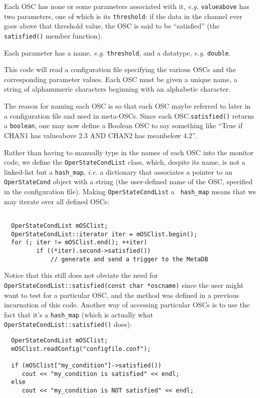 \documentclass[11pt]{article}
\begin{document}
Each OSC has none or some parameters associated with it, \textit{e.g.}
\texttt{valueabove} has two parameters, one of which is its
\texttt{threshold}: if the data in the channel ever goes above that
threshold value, the OSC is said to be ``satisfied'' (the
\texttt{satisfied()} member function).

Each parameter has a name, \textit{e.g.} \texttt{threshold}, and a
datatype, \textit{e.g.} \texttt{double}.

This code will read a configuration file specifying the various OSCs
and the corresponding parameter values.  Each OSC must be given a
unique name, a string of alphanumeric characters beginning with an
alphabetic character.

The reason for naming each OSC is so that each OSC maybe referred to
later in a configuration file and used in meta-OSCs.  Since each
OSC.\texttt{satisfied()} returns a \texttt{boolean}, one may now define a
Boolean OSC to say something like ``True if CHAN1 has valueabove 2.3
AND CHAN2 has meanbelow 4.2''.

Rather than having to manually type in the names of each OSC into the
monitor code, we define the \texttt{OperStateCondList} class, which,
despite its name, is not a linked-list but a \texttt{hash\_map}, \textit{
i.e.} a dictionary that associates a pointer to an \texttt{OperStateCond}
object with a string (the user-defined name of the OSC, specified in
the configuration file).  Making \texttt{OperStateCondList} a \texttt{
hash\_map} means that we may iterate over all defined OSCs:

\begin{verbatim}

  OperStateCondList mOSClist;
  OperStateCondList::iterator iter = mOSClist.begin();
  for (; iter != mOSClist.end(); ++iter)
         if ((*iter).second->satisfied())
             // generate and send a trigger to the MetaDB

\end{verbatim}

Notice that this still does not obviate the need for \texttt{
OperStateCondList::satisfied(const char *oscname)} since the user
might want to test for a particular OSC, and the method was defined in
a previous incarnation of this code.  Another way of accessing
particular OSCs is to use the fact that it's a \texttt{hash\_map}
(which is actually what \texttt{OperStateCondList::satisfied()} does):

\begin{verbatim}
  OperStateCondList mOSClist;
  mOSClist.readConfig("configfile.conf");
  
  if (mOSClist["my_condition"]->satisfied())
     cout << "my_condition is satisfied" << endl;
  else
     cout << "my_condition is NOT satisfied" << endl;
\end{verbatim}
\end{document}
